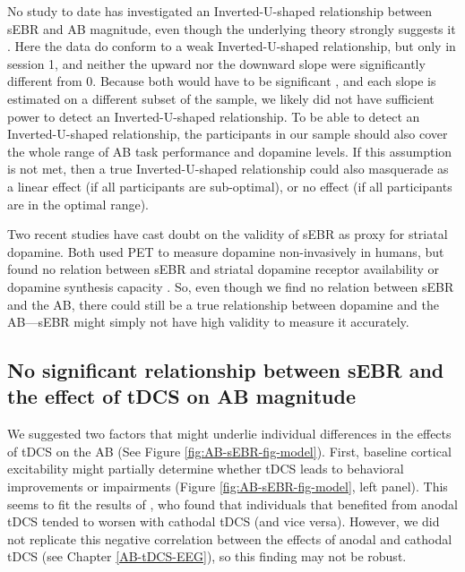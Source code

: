 \documentclass[11pt,english,]{memoir}
\begin{document}
No study to date has investigated an Inverted-U-shaped relationship between sEBR and AB magnitude, even though the underlying theory strongly suggests it \autocites{Cools2011}{Slagter2012}. Here the data do conform to a weak Inverted-U-shaped relationship, but only in session 1, and neither the upward nor the downward slope were significantly different from 0. Because both would have to be significant \autocite{Simonsohn2018}, and each slope is estimated on a different subset of the sample, we likely did not have sufficient power to detect an Inverted-U-shaped relationship. To be able to detect an Inverted-U-shaped relationship, the participants in our sample should also cover the whole range of AB task performance and dopamine levels. If this assumption is not met, then a true Inverted-U-shaped relationship could also masquerade as a linear effect (if all participants are sub-optimal), or no effect (if all participants are in the optimal range).

Two recent studies have cast doubt on the validity of sEBR as proxy for striatal dopamine. Both used PET to measure dopamine non-invasively in humans, but found no relation between sEBR and striatal dopamine receptor availability \autocite{Dang2017} or dopamine synthesis capacity \autocite{Sescousse2018}. So, even though we find no relation between sEBR and the AB, there could still be a true relationship between dopamine and the AB---sEBR might simply not have high validity to measure it accurately.

\hypertarget{no-significant-relationship-between-sebr-and-the-effect-of-tdcs-on-ab-magnitude}{%
\subsection{No significant relationship between sEBR and the effect of tDCS on AB magnitude}\label{no-significant-relationship-between-sebr-and-the-effect-of-tdcs-on-ab-magnitude}}

We suggested two factors that might underlie individual differences in the effects of tDCS on the AB (See Figure \ref{fig:AB-sEBR-fig-model}). First, baseline cortical excitability might partially determine whether tDCS leads to behavioral improvements or impairments \autocite{Krause2013} (Figure \ref{fig:AB-sEBR-fig-model}, left panel). This seems to fit the results of \textcite{London2015}, who found that individuals that benefited from anodal tDCS tended to worsen with cathodal tDCS (and vice versa). However, we did not replicate this negative correlation between the effects of anodal and cathodal tDCS (see Chapter \ref{AB-tDCS-EEG}), so this finding may not be robust.
\end{document}
